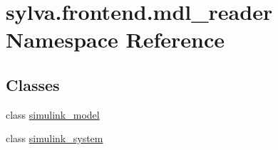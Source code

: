 \hypertarget{namespacesylva_1_1frontend_1_1mdl__reader}{}\section{sylva.\+frontend.\+mdl\+\_\+reader Namespace Reference}
\label{namespacesylva_1_1frontend_1_1mdl__reader}
\subsection*{Classes}
\begin{DoxyCompactItemize}
\item 
class \hyperlink{classsylva_1_1frontend_1_1mdl__reader_1_1simulink__model}{simulink\+\_\+model}
\item 
class \hyperlink{classsylva_1_1frontend_1_1mdl__reader_1_1simulink__system}{simulink\+\_\+system}
\end{DoxyCompactItemize}
